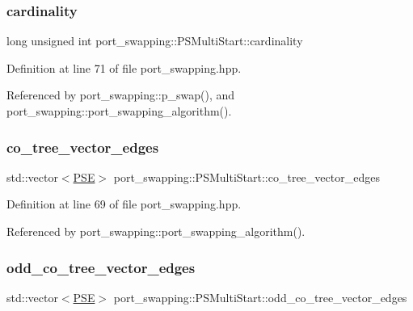 \subsubsection{\texorpdfstring{cardinality}{cardinality}}
{\footnotesize\ttfamily long unsigned int port\+\_\+swapping\+::\+P\+S\+Multi\+Start\+::cardinality}



Definition at line 71 of file port\+\_\+swapping.\+hpp.



Referenced by port\+\_\+swapping\+::p\+\_\+swap(), and port\+\_\+swapping\+::port\+\_\+swapping\+\_\+algorithm().

\mbox{\label{structport__swapping_1_1PSMultiStart_a98b2092189fba94528fc0c2b261bb08b}} 
\subsubsection{\texorpdfstring{co\+\_\+tree\+\_\+vector\+\_\+edges}{co\_tree\_vector\_edges}}
{\footnotesize\ttfamily std\+::vector$<$\hyperlink{classport__swapping_ac98b23b7c2dd3f3792327fb666489d66}{P\+SE}$>$ port\+\_\+swapping\+::\+P\+S\+Multi\+Start\+::co\+\_\+tree\+\_\+vector\+\_\+edges}



Definition at line 69 of file port\+\_\+swapping.\+hpp.



Referenced by port\+\_\+swapping\+::port\+\_\+swapping\+\_\+algorithm().

\mbox{\label{structport__swapping_1_1PSMultiStart_ae4c62c26b89edc00edc4a50e8492c8ea}} 
\subsubsection{\texorpdfstring{odd\+\_\+co\+\_\+tree\+\_\+vector\+\_\+edges}{odd\_co\_tree\_vector\_edges}}
{\footnotesize\ttfamily std\+::vector$<$\hyperlink{classport__swapping_ac98b23b7c2dd3f3792327fb666489d66}{P\+SE}$>$ port\+\_\+swapping\+::\+P\+S\+Multi\+Start\+::odd\+\_\+co\+\_\+tree\+\_\+vector\+\_\+edges}



